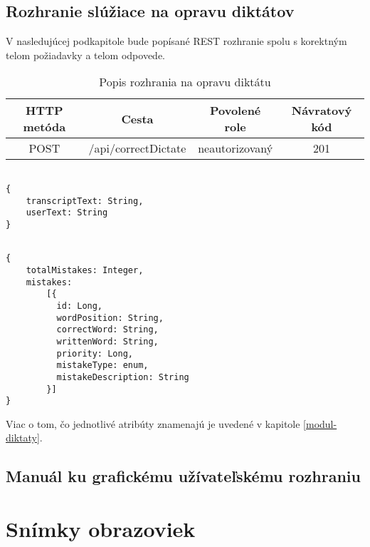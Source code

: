 \documentclass[12pt,oneside]{fithesis2}
\begin{document}
      \section{Rozhranie slúžiace na opravu diktátov} \label{navod_oprava}
      \par V nasledujúcej podkapitole bude popísané REST rozhranie spolu s korektným telom požiadavky a telom odpovede.
\begin{table}[htbp]
\centering
\begin{tabular}{@{}|c|c|c|c|@{}}
\hline
\textbf{HTTP metóda} & \textbf{Cesta} & \textbf{Povolené role} & \textbf{Návratový kód}  \\ \hline
           POST     &  /api/correctDictate         &     neautorizovaný       &    201        \\ \hline
\end{tabular}
\caption{Popis rozhrania na opravu diktátu}
\label{rozhranie-oprava}
\end{table}
\lstset{language=Java}          %
\begin{lstlisting}[frame=single]  % Start your code-block

{ 
	transcriptText: String,
	userText: String
}
\end{lstlisting}
\bigskip
\lstset{language=Java}          %
\begin{lstlisting}[frame=single]  % Start your code-block

{ 
	totalMistakes: Integer,
	mistakes: 
		[{ 
		  id: Long,
		  wordPosition: String,
		  correctWord: String,
		  writtenWord: String,
		  priority: Long,
		  mistakeType: enum,
		  mistakeDescription: String 	
		}]	
}
\end{lstlisting}
\bigskip
\par Viac o tom, čo jednotlivé atribúty znamenajú je uvedené v kapitole \ref{modul-diktaty}.




      \section{Manuál ku grafickému užívateľskému rozhraniu}
    \chapter{Snímky obrazoviek}
\end{document}
